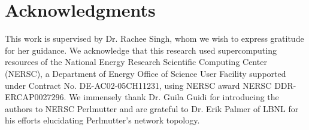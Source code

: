 
\section{Acknowledgments}\label{sec:acknowledgments}
This work is supervised by Dr. Rachee Singh, whom we wish to express gratitude for her guidance.
We acknowledge that this research used supercomputing resources of the National Energy Research
Scientific Computing Center (NERSC), a Department of Energy Office of Science User Facility
supported under Contract No. DE-AC02-05CH11231, using NERSC award NERSC DDR-ERCAP0027296.
We immensely thank Dr. Guila Guidi for introducing the authors to NERSC Perlmutter and
are grateful to Dr. Erik Palmer of LBNL for his efforts elucidating Perlmutter's network topology.